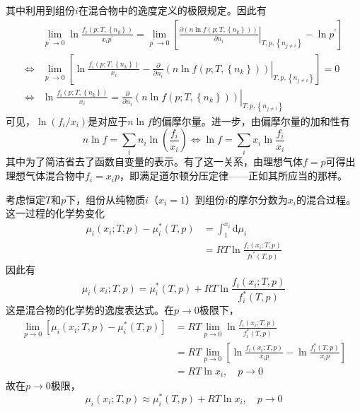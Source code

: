 \documentclass[main.tex]{subfiles}
\begin{document}
其中利用到组份$i$在混合物中的逸度定义的极限规定。因此有
\begin{align*}
                    & \lim_{p^\prime\to 0}\ln\frac{f_i\left(p;T,\left\{n_k\right\}\right)}{x_ip^\prime}=\lim_{p^\prime\to 0}\left[\left.\frac{\partial\left(n\ln f\left(p;T,\left\{n_k\right\}\right)\right)}{\partial n_i}\right|_{T,p,\left\{n_{j\neq i}\right\}}-\ln p^\prime\right] \\
    \Leftrightarrow & \lim_{p^\prime\to 0}\left[\ln\frac{f_i\left(p;T,\left\{n_k\right\}\right)}{x_i}-\left.\frac{\partial}{\partial n_i}\left(n\ln f\left(p;T,\left\{n_k\right\}\right)\right)\right|_{T,p,\left\{n_{j\neq i}\right\}}\right]=0                                        \\
    \Leftrightarrow & \ln\frac{f_i\left(p;T,\left\{n_k\right\}\right)}{x_i}=\left.\frac{\partial}{\partial n_i}\left(n\ln f\left(p;T,\left\{n_k\right\}\right)\right)\right|_{T,p,\left\{n_{j\neq i}\right\}}
\end{align*}
可见，$\ln \left(f_i/x_i\right)$是对应于$n\ln f$的偏摩尔量。进一步，由偏摩尔量的加和性有
\[n\ln f=\sum_i n_i \ln\left(\frac{f_i}{x_i}\right)\Leftrightarrow\ln f=\sum_ix_i\ln\frac{f_i}{x_i}\]
其中为了简洁省去了函数自变量的表示。有了这一关系，由理想气体$f=p$可得出理想气体混合物中$f_i=x_ip$，即满足道尔顿分压定律——正如其所应当的那样。

考虑恒定$T$和$p$下，组份从纯物质$i$（$x_i=1$）到组份$i$的摩尔分数为$x_i$的混合过程。这一过程的化学势变化
\begin{align*}
    \mu_i\left(x_i;T,p\right)-\mu_i^*\left(T,p\right) & =\int_1^{x_i}\mathrm{d}\mu_i                               \\
                                                      & =RT\ln\frac{f_i\left(x_i;T,p\right)}{fi^*\left(T,p\right)}
\end{align*}
因此有
\[\mu_i\left(x_i;T,p\right)=\mu_i^*\left(T,p\right)+RT\ln\frac{f_i\left(x_i;T,p\right)}{f_i^*\left(T,p\right)}\]
这是混合物的化学势的逸度表达式。在$p\rightarrow 0$极限下，
\begin{align*}
    \lim_{p\to 0}\left[\mu_i\left(x_i;T,p\right)-\mu_i^*\left(T,p\right)\right] & =RT\lim_{p\to 0}\ln\frac{f_i\left(x_i;T,p\right)}{f_i^*\left(T,p\right)}                                   \\
                                                                                & =RT\lim_{p\to 0}\left[\ln\frac{f_i\left(x_i;T,p\right)}{x_ip}-\ln\frac{f_i^*\left(T,p\right)}{x_ip}\right] \\
                                                                                & =RT\ln x_i,\quad p\rightarrow 0
\end{align*}
故在$p\rightarrow 0$极限，
\[\mu_i\left(x_i;T,p\right)\approx\mu_i^*\left(T,p\right)+RT\ln x_i,\quad p\rightarrow 0\]
\end{document}

